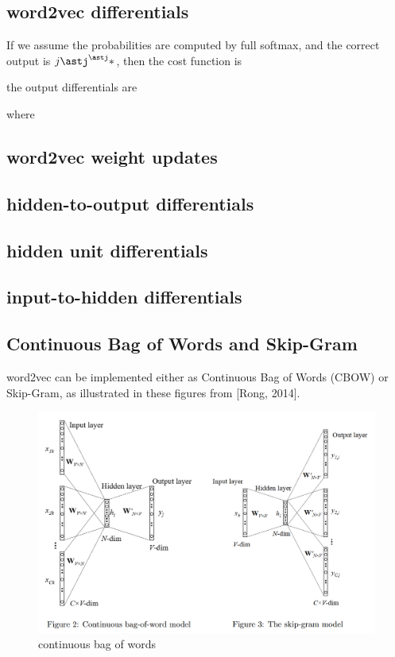\documentclass[11pt]{article}
\begin{document}
\subsection{word2vec differentials}\label{subsec:word2vec-differentials}
If we assume the probabilities are computed by full softmax, and the correct
output is $j\astj^\astj\ast$, then the cost function is

the output differentials are

where

\subsection{word2vec weight updates}\label{subsec:word2vec-weight-updates}

\subsection{hidden-to-output differentials}\label{subsec:hidden-to-output-differentials}

\subsection{hidden unit differentials}\label{subsec:hidden-unit-differentials}

\subsection{input-to-hidden differentials}\label{subsec:input-to-hidden-differentials}

\subsection{Continuous Bag of Words and Skip-Gram}\label{subsec:continuous-bag-of-words-and-skip-gram}
word2vec can be implemented either as Continuous Bag of Words (CBOW) or Skip-Gram, as illustrated in these figures from [Rong, 2014].

\begin{figure}[H]
    \centering
    \includegraphics{../out/images/continuous-bag-of-words}
    \caption[continuous bag of words]{continuous bag of words}
    \label{fig:continuous bag of words}
\end{figure}
\end{document}
